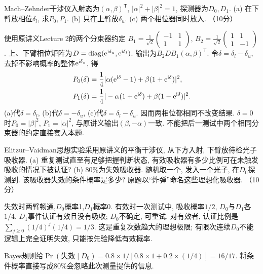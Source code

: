 \begin{exercise}
Mach--Zehnder干涉仪入射态为$(\alpha,\beta)^{\mathsf T}$, $|\alpha|^2+|\beta|^2=1$, 探测器为$D_0,D_1$.
(a) 在下臂放相位$\delta_l$, 求$P_0,P_1$.
(b) 只在上臂放$\delta_u$.
(c) 两个相位器同时放入. （10分）
\end{exercise}
\begin{solution}
使用原讲义Lecture 2的两个分束器约定
$B_1=\frac1{\sqrt2}\begin{pmatrix}-1&1\\1&1\end{pmatrix}$,
$B_2=\frac1{\sqrt2}\begin{pmatrix}1&1\\1&-1\end{pmatrix}$.
上、下臂相位矩阵为$D=\operatorname{diag}(\mathrm e^{\mathrm i\delta_u},\mathrm e^{\mathrm i\delta_l})$. 输出为$B_2DB_1(\alpha,\beta)^{\mathsf T}$. 令$\delta=\delta_l-\delta_u$, 去掉不影响概率的整体$\mathrm e^{\mathrm i\delta_u}$, 得
\begin{align*}
P_0(\delta)&=\frac14|\alpha(\mathrm e^{\mathrm i\delta}-1)+\beta(1+\mathrm e^{\mathrm i\delta})|^2,\\
P_1(\delta)&=\frac14|-\alpha(1+\mathrm e^{\mathrm i\delta})+\beta(1-\mathrm e^{\mathrm i\delta})|^2.
\end{align*}
(a)代$\delta=\delta_l$, (b)代$\delta=-\delta_u$, (c)代$\delta=\delta_l-\delta_u$. 因而两相位都相同不改变结果. $\delta=0$时$P_0=|\beta|^2$, $P_1=|\alpha|^2$, 与原讲义输出$(\beta,-\alpha)$一致. 不能把后一测试中两个相同分束器的约定直接套入本题.
\end{solution}

\begin{exercise}
Elitzur--Vaidman思想实验采用原讲义的平衡干涉仪, 从下方入射, 下臂放待检光子吸收器.
(a) 重复测试直至有足够把握判断状态, 有效吸收器有多少比例可在未触发吸收的情况下被认证?
(b) 80\%为失效吸收器. 随机取一个, 发入一个光子, 在$D_0$探测到. 该吸收器失效的条件概率是多少? 原题以“炸弹”命名这些理想化吸收器. （10分）
\end{exercise}
\begin{solution}
失效时两臂畅通,$D_0$概率1,$D_1$概率0. 有效时一次测试中, 吸收概率$1/2$, $D_0$与$D_1$各$1/4$. $D_1$事件认证有效且没有吸收; $D_0$不确定, 可重试. 对有效者, 认证比例是$\sum_{j\ge0}(1/4)^j(1/4)=1/3$. 这是重复次数趋大的理想极限; 有限次连续$D_0$不能逻辑上完全证明失效, 只能按先验降低有效概率.

Bayes规则给$\Pr(\text{失效}\mid D_0)=0.8\times1/[0.8\times1+0.2\times(1/4)]=16/17$. 将条件概率直接写成80\%会忽略此次测量提供的信息.
\end{solution}
